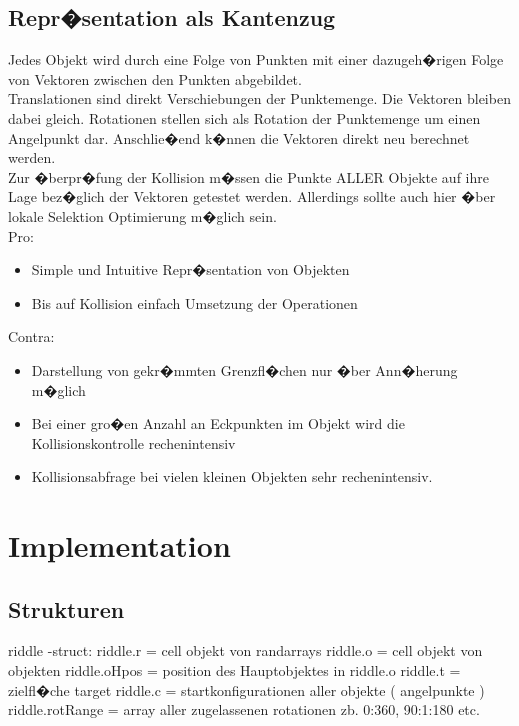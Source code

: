 \subsection{Repr�sentation als Kantenzug}
Jedes Objekt wird durch eine Folge von Punkten mit einer dazugeh�rigen Folge von Vektoren zwischen den Punkten abgebildet.\\
Translationen sind direkt Verschiebungen der Punktemenge. Die Vektoren bleiben dabei gleich. Rotationen stellen sich als Rotation der Punktemenge um einen Angelpunkt dar. Anschlie�end k�nnen die Vektoren direkt neu berechnet werden.\\
 Zur �berpr�fung der Kollision m�ssen die Punkte ALLER Objekte auf ihre Lage bez�glich der Vektoren getestet werden. Allerdings sollte auch hier �ber lokale Selektion Optimierung m�glich sein.\\
Pro:
\begin{itemize}
\item Simple und Intuitive Repr�sentation von Objekten
\item Bis auf Kollision einfach Umsetzung der Operationen
\end{itemize}
Contra:
\begin{itemize}
\item Darstellung von gekr�mmten Grenzfl�chen nur �ber Ann�herung m�glich
\item Bei einer gro�en Anzahl an Eckpunkten im Objekt wird die Kollisionskontrolle rechenintensiv
\item Kollisionsabfrage bei vielen kleinen Objekten sehr rechenintensiv.
\end{itemize}

\section{Implementation}

\subsection{Strukturen}

riddle -struct:
riddle.r = cell objekt von randarrays
riddle.o = cell objekt von objekten
riddle.oHpos = position des Hauptobjektes in riddle.o
riddle.t = zielfl�che target
riddle.c = startkonfigurationen aller objekte ( angelpunkte )
riddle.rotRange = array aller zugelassenen rotationen zb. 0:360, 90:1:180 etc.



